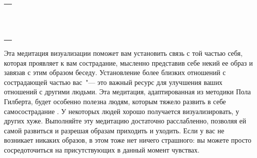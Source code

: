 \setlength{\extrarowheight}{2mm}
\begin{tabularx}{\textwidth}{X}
	\\
	\arrayrulecolor{gray}\hline\\
	\hline\\
	\hline\\
	\hline\\
	\hline\\
	\hline\\	
	\hline\\
	\hline\\
	\hline\\
	\hline\\
	\hline\\
	\hline\\
	\hline\\
\end{tabularx}
\setlength{\extrarowheight}{0mm}


 \label{M:Compassionate_Friend}

Эта медитация визуализации поможет вам установить связь с той частью себя, которая проявляет к вам сострадание, мысленно представив себе некий ее образ и завязав с этим образом беседу. Установление более близких отношений с сострадающей частью вас~"--- это важный ресурс для улучшения ваших отношений с другими людьми. Эта медитация, адаптированная из методики Пола Гилберта, будет особенно полезна людям, которым тяжело развить в себе самосострадание \cite{98}. У некоторых людей хорошо получается визуализировать, у других хуже. Выполняйте эту медитацию достаточно расслабленно, позволяя ей самой развиться и разрешая образам приходить и уходить. Если у вас не возникает никаких образов, в этом тоже нет ничего страшного: вы можете просто сосредоточиться на присутствующих в данный момент чувствах.

